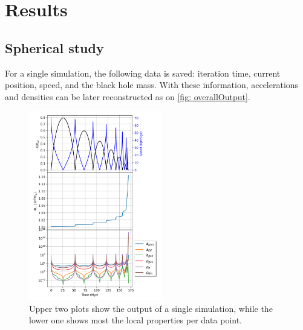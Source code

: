 
%



\chapter{Results}
	\section{Spherical study}
	For a single simulation, the following data is saved: iteration time, current position, speed, and the black hole mass. With these information, accelerations and densities can be later reconstructed as on \autoref{fig: overallOutput}.
	\begin{figure}[h]
		\centering
		\includegraphics[width = 0.52\textwidth]{"../Files/Week 6/properties_s02v70"}
		\caption{Upper two plots show the output of a single simulation, while the lower one shows most the local properties per data point.}
		\label{fig: overallOutput}
	\end{figure}
	

